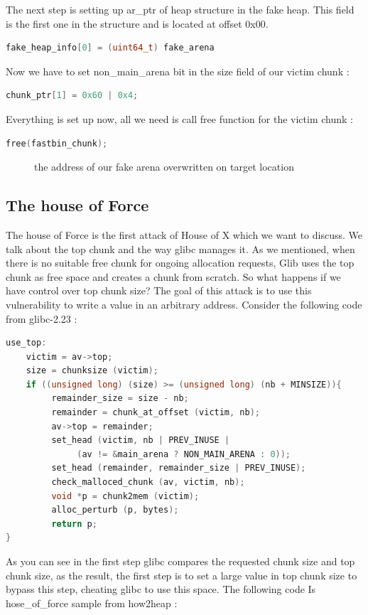 \documentclass{masterthesis}
\newcommand*\libc{glibc}
\begin{document}
The next step is setting up ar\_ptr of heap structure in the fake heap. This field is the first one in the structure and is located at offset 0x00. 

\begin{lstlisting}[language=c,frame=tlrb]
fake_heap_info[0] = (uint64_t) fake_arena
\end{lstlisting}

Now we have to set non\_main\_arena bit in the size field of our victim chunk :

\begin{lstlisting}[language=c,frame=tlrb]
chunk_ptr[1] = 0x60 | 0x4;
\end{lstlisting}

Everything is set up now, all we need is call free function for the victim chunk :

\begin{lstlisting}[language=c,frame=tlrb]
free(fastbin_chunk); 
\end{lstlisting}

\begin{figure}[h!]
  \caption{the address of our fake arena overwritten on target location}
\end{figure}

\subsection{The house of Force}
The house of Force is the first attack of House of X which we want to discuss. We talk about the top chunk and the way \libc{} manages it. As we mentioned, when there is no suitable free chunk for ongoing allocation requests, Glib uses the top chunk as free space and creates a chunk from scratch. So what happens if we have control over top chunk size? The goal of this attack is to use this vulnerability to write a value in an arbitrary address. Consider the following code from \libc{-2.23} :
\begin{lstlisting}[language=c,frame=tlrb]
use_top:
	victim = av->top;
	size = chunksize (victim);
	if ((unsigned long) (size) >= (unsigned long) (nb + MINSIZE)){
	     remainder_size = size - nb;
	     remainder = chunk_at_offset (victim, nb);
	     av->top = remainder;
	     set_head (victim, nb | PREV_INUSE |
	          (av != &main_arena ? NON_MAIN_ARENA : 0));
	     set_head (remainder, remainder_size | PREV_INUSE);
	     check_malloced_chunk (av, victim, nb);
	     void *p = chunk2mem (victim);
	     alloc_perturb (p, bytes);
	     return p;
}
\end{lstlisting}
As you can see in the first step \libc{} compares the requested chunk size and top chunk size, as the result, the first step is to set a large value in top chunk size to bypass this step, cheating \libc{} to use this space. The following code Is hose\_of\_force sample from how2heap :
\end{document}
